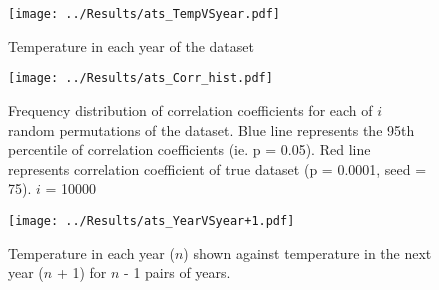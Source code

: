 \documentclass[12pt]{article}
\begin{document}
		
	\begin{figure}
		\texttt{[image: ../Results/ats\_TempVSyear.pdf]}				
		\caption{\label{fig:dataset} Temperature in each year of the dataset}
	\end{figure}
	
	\begin{figure}
		\texttt{[image: ../Results/ats\_Corr\_hist.pdf]}
		\caption{\label{fig:histogram} Frequency distribution of correlation coefficients for each of $i$ random permutations of the dataset. Blue line represents the 95th percentile of correlation coefficients (ie. p = 0.05). Red line represents correlation coefficient of true dataset (p = 0.0001, seed = 75). $i$ = 10000}
	\end{figure}
	
	\begin{figure}
		\texttt{[image: ../Results/ats\_YearVSyear+1.pdf]}
		\caption{\label{fig:n+1} Temperature in each year ($n$) shown against temperature in the next year ($n$ + 1) for $n$ - 1 pairs of years. }
	\end{figure}
	
\end{document}
